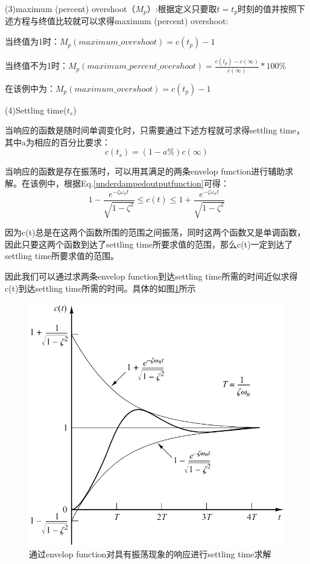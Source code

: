 \documentclass{article}
\numberwithin{equation}{section}
\numberwithin{figure}{section}
\begin{document}
(3)maximum (percent) overshoot（$M_p$）:根据定义只要取$t=t_p$时刻的值并按照下述方程与终值比较就可以求得maximum (percent) overshoot:

当终值为1时：$M_p(maximum\_overshoot)=c(t_p)-1$

当终值不为1时：$M_p(maximum\_percent\_overshoot)=\frac{c(t_p)-c(∞)}{c(∞)}*100\%$

在该例中为：$M_p(maximum\_overshoot)=c(t_p)-1$

(4)Settling time($t_s$)

当响应的函数是随时间单调变化时，只需要通过下述方程就可求得settling time，其中a为相应的百分比要求：
\begin{equation}
    c(t_s)=(1-a\%)c(∞)
\end{equation}

当响应的函数是存在振荡时，可以用其满足的两条envelop function进行辅助求解。在该例中，根据Eq.\ref{underdampedoutputfunction}可得：
\begin{equation}
    1-\frac{e^{-\zeta \omega_nt}}{\sqrt{1-\zeta^2}}≤c(t)≤1+\frac{e^{-\zeta \omega_nt}}{\sqrt{1-\zeta^2}}
\end{equation}

因为c(t)总是在这两个函数所围的范围之间振荡，同时这两个函数又是单调函数，因此只要这两个函数到达了settling time所要求值的范围，那么c(t)一定到达了settling time所要求值的范围。

因此我们可以通过求两条envelop function到达settling time所需的时间近似求得c(t)到达settling time所需的时间。具体的如图\ref{settlingtime}所示

\begin{figure}
    \centering
    \includegraphics[width=.6\textwidth]{Chapter5/settlingtime.png} %
    \caption{通过envelop function对具有振荡现象的响应进行settling time求解} %
    \label{settlingtime} %
\end{figure}
\end{document}
